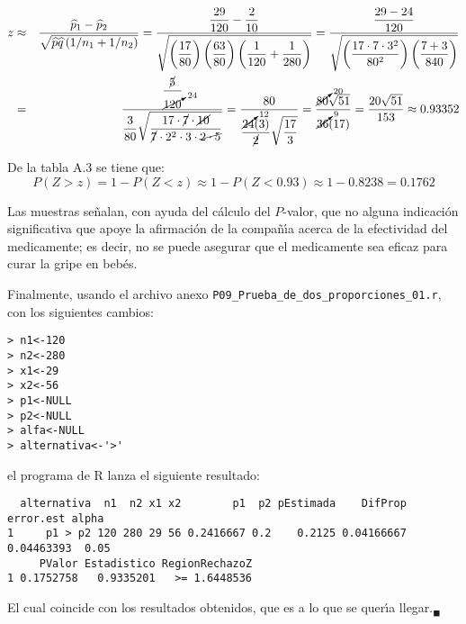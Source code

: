 \begin{solucion}
 \begin{estadistico}
  \begin{eqnarray*}
   z & \approx &
   \frac{
   \widehat{p}_1 - \widehat{p}_2
   }{
   \sqrt{\widehat{p}\widehat{q}\left(1/n_1+1/n_2\right)}
   }
   = \frac{
   \displaystyle{ \frac{29}{120} - \frac{2}{10}}
   }{
   \displaystyle{ \sqrt{
   \left(\frac{17}{80}\right)\left(\frac{63}{80}\right)
   \left(\frac{1}{120} + \frac{1}{280}\right)
   }}}
   = \frac{
   \displaystyle{\frac{29-24}{120}}
   }{\displaystyle{
   \sqrt{\left(\frac{17\cdot 7\cdot 3^2}{80^2}\right)\left( \frac{7+3}{840} \right)}
   }} \\
   & = & \frac{\displaystyle{\frac{\cancel{5}}{\cancelto{24}{120}}}}{\displaystyle{
   \frac{3}{80} \sqrt{
   \frac{
   17\cdot \cancel{7} \cdot \cancel{10}
   }{
   \cancel{7}\cdot 2^2 \cdot 3 \cdot \cancel{2\cdot 5}
   } }
   }}
   = \frac{80}{\displaystyle{
   \frac{ \cancelto{12}{24}(3)}{\cancel{2}}\sqrt{\frac{17}{3}}
   }}
   = \frac{\cancelto{20}{80}\sqrt{51}}{\cancelto{9}{36}(17)}
   = \frac{20\sqrt{51}}{153} \approx 0.93352
  \end{eqnarray*}
 \end{estadistico}

 \begin{valorp}
  De la tabla A.3 se tiene que:
  \begin{equation*}
   P(Z > z) = 1 - P(Z < z) \approx 1-P(Z<0.93) \approx 1 - 0.8238
   = 0.1762
  \end{equation*}
 \end{valorp}

 \begin{conclusion}
  Las muestras se\~nalan, con ayuda del c\'alculo del $P$-valor,
  que no alguna indicaci\'on significativa que apoye la afirmaci\'on
  de la compa\~n\'{\i}a acerca de la efectividad del medicamente;
  es decir, no se puede asegurar que el medicamente sea eficaz
  para curar la gripe en beb\'es.
 \end{conclusion}

 Finalmente, usando el archivo anexo \texttt{P09\_Prueba\_de\_dos\_proporciones\_01.r}, con los siguientes cambios:
 \begin{verbatim}
> n1<-120
> n2<-280
> x1<-29
> x2<-56
> p1<-NULL
> p2<-NULL
> alfa<-NULL
> alternativa<-'>'
 \end{verbatim}
 \vspace{-0.5cm}
 el programa de R lanza el siguiente resultado:
 \begin{verbatim}
  alternativa  n1  n2 x1 x2        p1  p2 pEstimada    DifProp  error.est alpha
1     p1 > p2 120 280 29 56 0.2416667 0.2    0.2125 0.04166667 0.04463393  0.05
     PValor Estadistico RegionRechazoZ
1 0.1752758   0.9335201   >= 1.6448536
 \end{verbatim}
 \vspace{-0.5cm}
 El cual coincide con los resultados obtenidos,
 que es a lo que se quer\'{\i}a llegar.${}_{\blacksquare}$
\end{solucion}
